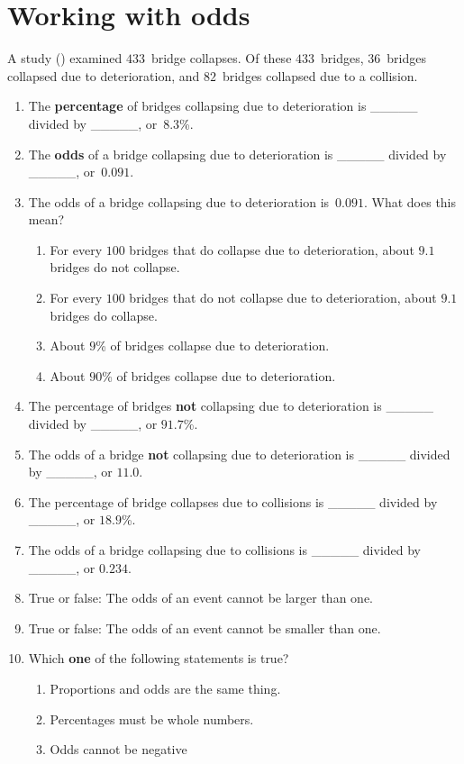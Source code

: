 \documentclass[
  11pt,
  a4paper,
  krantz2]{krantz}
\providecommand{\tightlist}{%
  \setlength{\itemsep}{0pt}\setlength{\parskip}{0pt}}
\begin{document}
\pagebreak

\section{Working with odds}\label{WorkingWithOdds}

A study () examined \(433\)~bridge collapses.
Of these \(433\)~bridges, \(36\)~bridges collapsed due to deterioration, and \(82\)~bridges collapsed due to a collision.

\begin{enumerate}
\def\labelenumi{\arabic{enumi}.}
\item
  The \textbf{percentage} of bridges collapsing due to deterioration is \_\_\_\_\_ divided by \_\_\_\_\_, or~\(8.3\)\%.
\item
  The \textbf{odds} of a bridge collapsing due to deterioration is \_\_\_\_\_ divided by \_\_\_\_\_, or~\(0.091\).
\item
  The odds of a bridge collapsing due to deterioration is~\(0.091\).
  What does this mean?

  \begin{enumerate}
  \def\labelenumii{\alph{enumii}.}
  \tightlist
  \item
    For every \(100\) bridges that do collapse due to deterioration, about \(9.1\) bridges do not collapse.
  \item
    For every \(100\) bridges that do not collapse due to deterioration, about \(9.1\) bridges do collapse.
  \item
    About \(9\)\% of bridges collapse due to deterioration.
  \item
    About \(90\)\% of bridges collapse due to deterioration.
  \end{enumerate}
\item
  The percentage of bridges \textbf{not} collapsing due to deterioration is \_\_\_\_\_ divided by \_\_\_\_\_, or \(91.7\)\%.
\item
  The odds of a bridge \textbf{not} collapsing due to deterioration is \_\_\_\_\_ divided by \_\_\_\_\_, or \(11.0\).
\item
  The percentage of bridge collapses due to collisions is \_\_\_\_\_ divided by \_\_\_\_\_, or \(18.9\)\%.
\item
  The odds of a bridge collapsing due to collisions is \_\_\_\_\_ divided by \_\_\_\_\_, or \(0.234\).
\item
  True or false: The odds of an event cannot be larger than one.
\item
  True or false: The odds of an event cannot be smaller than one.
\item
  Which \textbf{one} of the following statements is true?

  \begin{enumerate}
  \def\labelenumii{\alph{enumii}.}
  \tightlist
  \item
    Proportions and odds are the same thing.
  \item
    Percentages must be whole numbers.
  \item
    Odds cannot be negative
  \end{enumerate}
\end{enumerate}
\end{document}
